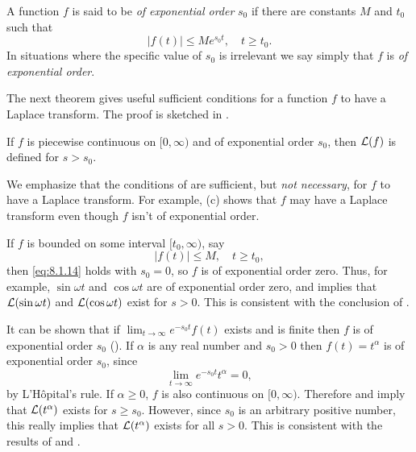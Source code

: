 \begin{definition}\label{thmtype:8.1.5}
A function $f$ is said to be
\emph{\color{blue}of exponential order}
$s_0$ if there are constants $M$ and $t_0$
such that
\begin{equation}\label{eq:8.1.14}
|f(t)|\le Me^{s_0t},\quad t\ge t_0.
\end{equation}
In situations where the specific value of $s_0$
is irrelevant we say simply that $f$ is \emph{\color{blue}of exponential order}.
\end{definition}

The next theorem gives useful sufficient conditions for a function $f$
to have a Laplace transform.  The proof is sketched in
.

\begin{theorem}\label{thmtype:8.1.6} If $f$
is piecewise continuous on $[0,\infty)$ and of exponential order $s_0$,
 then ${\mathcal L}(f)$ is defined for $s>s_0$.
\end{theorem}

\begin{remark*}
We emphasize that the conditions of 
 are sufficient, but \emph{\color{blue}not necessary}, for $f$ to have a Laplace
transform. For example, (c) shows that  $f$
may have a Laplace transform even though $f$ isn't  of exponential
order.
\end{remark*}

\begin{example}\label{example:8.1.8}
If $f$ is bounded on some interval $[t_0,\infty)$, say
\[
|f(t)|\le M,\quad t\ge t_0,
\]
then \eqref{eq:8.1.14} holds with $s_0=0$, so $f$ is of exponential order
zero. Thus, for example, $\sin\omega t$ and $\cos \omega t$ are of
exponential order zero, and  implies that
${\mathcal L}(\sin\omega t)$ and ${\mathcal L}(\cos \omega t)$ exist for
$s>0$. This is consistent with the conclusion of
.
\end{example}

\begin{example}\label{example:8.1.9}
It can be shown that if $\lim_{t\to\infty}e^{-s_0t}f(t)$ exists and is
finite then $f$ is of exponential order $s_0$
(). If $\alpha$ is any real number and $s_0>0$
then $f(t)=t^\alpha$ is of exponential order $s_0$, since
\[
\lim_{t\to\infty}e^{-s_0t}t^\alpha=0,
\]
by L'Hôpital's rule. If $\alpha\ge 0$, $f$ is also
continuous on $[0,\infty)$. Therefore  and
 imply that ${\mathcal L}(t^\alpha)$ exists for
$s\ge s_0$. However, since $s_0$ is an arbitrary positive number, this
really implies that ${\mathcal L}(t^\alpha)$ exists for all $s>0$. This is
consistent with the results of  and
.
\end{example}

